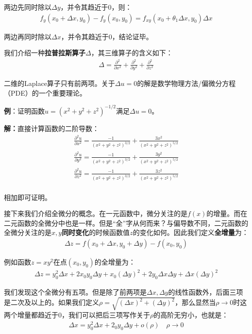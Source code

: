\documentclass{ctexart}
\let\oldtextbf\textbf %
\renewcommand{\textbf}[1]{\textcolor{btex}{\oldtextbf{#1}}} %
\begin{document}
两边先同时除以$\Delta y$，并令其趋近于0，则：
\begin{align*}
    f_y(x_0+\Delta x,y_0)-f_y(x_0,y_0)=f_{xy}(x_0+\theta_1\Delta x,y_0)\Delta x
\end{align*}

两边再同时除以$\Delta x$，并令其趋近于0，结论证毕。

我们介绍一种\textbf{拉普拉斯算子}$\Delta$，其三维算子的含义如下：
\begin{align*}
    \Delta=\frac{\partial^2}{\partial x^2}+\frac{\partial^2}{\partial y^2}+\frac{\partial ^2}{\partial z^2}
\end{align*}

二维的Laplace算子只有前两项。关于$\Delta u=0$的解是数学物理方法/偏微分方程（PDE）的一个重要理论。

\textbf{例}：证明函数$u=(x^2+y^2+z^2)^{-1/2}$满足$\Delta u=0$。

\textbf{解：}直接计算函数的二阶导数：
\begin{align*}
\frac{\partial^2 u}{\partial x^2}=\frac{-1}{(x^2+y^2+z^2)^{3/2}}+\frac{3x^2}{(x^2+y^2+z^2)^{5/2}}\\
\frac{\partial^2 u}{\partial y^2}=\frac{-1}{(x^2+y^2+z^2)^{3/2}}+\frac{3y^2}{(x^2+y^2+z^2)^{5/2}}\\
\frac{\partial^2 u}{\partial z^2}=\frac{-1}{(x^2+y^2+z^2)^{3/2}}+\frac{3z^2}{(x^2+y^2+z^2)^{5/2}}\\
\end{align*}

相加即可证明。

接下来我们介绍全微分的概念。在一元函数中，微分关注的是$f(x)$的增量。而在二元函数的全微分中也是一样。但是“全”字从何而来？与偏导数不同，二元函数的全微分关注的是$x,y$\textbf{同时变化}的时候函数值$z$的变化如何。因此我们定义\textbf{全增量}为：
\begin{align*}
    \Delta z=f(x_0+\Delta x,y_0+\Delta y)-f(x_0,y_0)
\end{align*}

例如函数$z=xy^2$在点$(x_0,y_0)$的全增量为：
\begin{align*}
    \Delta z=y_0^2\Delta x+2x_0y_0\Delta y+x_0(\Delta y)^2+2y_0\Delta x\Delta y+\Delta x(\Delta y)^2
\end{align*}

我们发现这个全微分有五项。但是除了前两项是$\Delta x,\Delta y$的线性函数外，后面三项是二次及以上的。如果我们定义$\rho=\sqrt{(\Delta x)^2+(\Delta y)^2}$，那么显然当$\rho\to 0$时这两个增量都趋近于0，我们可以把后三项写作关于$\rho$的高阶无穷小，也就是：
\begin{align*}
    \Delta x=y_0^2\Delta x+2_0y_0\Delta y+o(\rho)\quad \rho\to 0
\end{align*}
\end{document}
